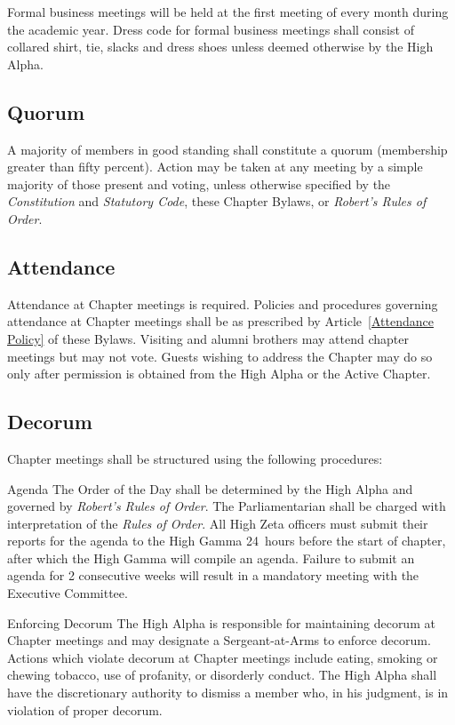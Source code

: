 \documentclass{article}
\begin{document}
Formal business meetings will be held at the first meeting of every month during
the academic year. Dress code for formal business meetings shall consist of
collared shirt, tie, slacks and dress shoes unless deemed otherwise by the High
Alpha.

\subsection{Quorum}

A majority of members in good standing shall constitute a quorum (membership
greater than fifty percent). Action may be taken at any meeting by a simple
majority of those present and voting, unless otherwise specified by the
\emph{Constitution} and \emph{Statutory Code}, these Chapter Bylaws, or
\emph{Robert’s Rules of Order}.

\subsection{Attendance}

Attendance at Chapter meetings is required. Policies and procedures governing
attendance at Chapter meetings shall be as prescribed by
Article~\ref{Attendance Policy} of these Bylaws. Visiting and alumni brothers
may attend chapter meetings but may not vote. Guests wishing to address the
Chapter may do so only after permission is obtained from the High Alpha or the
Active Chapter.

\subsection{Decorum}

Chapter meetings shall be structured using the following procedures:

\begin{subsubsectionList}
  \item {\titleStyle Agenda\titleSuffix}
  The Order of the Day shall be determined by the High Alpha and governed by
  \emph{Robert’s Rules of Order}. The Parliamentarian shall be charged with
  interpretation of the \emph{Rules of Order}. All High Zeta officers must
  submit their reports for the agenda to the High Gamma 24~hours before the
  start of chapter, after which the High Gamma will compile an agenda. Failure
  to submit an agenda for 2 consecutive weeks will result in a mandatory meeting
  with the Executive Committee.

  \item {\titleStyle Enforcing Decorum\titleSuffix}
  The High Alpha is responsible for maintaining decorum at Chapter meetings and
  may designate a Sergeant-at-Arms to enforce decorum. Actions which violate
  decorum at Chapter meetings include eating, smoking or chewing tobacco, use of
  profanity, or disorderly conduct. The High Alpha shall have the discretionary
  authority to dismiss a member who, in his judgment, is in violation of proper
  decorum.
\end{subsubsectionList}
\end{document}

